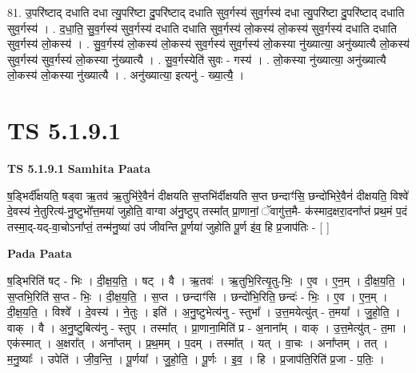 \documentclass[17pt]{extarticle}
\begin{document}
81. उ॒परि॑ष्टाद् दधाति दधा त्यु॒परि॑ष्टा दु॒परि॑ष्टाद् दधाति सुव॒र्गस्य॑ सुव॒र्गस्य॑ दधा त्यु॒परि॑ष्टा दु॒परि॑ष्टाद् दधाति सुव॒र्गस्य॑ । . द॒धा॒ति॒ सु॒व॒र्गस्य॑ सुव॒र्गस्य॑ दधाति दधाति सुव॒र्गस्य॑ लो॒कस्य॑ लो॒कस्य॑ सुव॒र्गस्य॑ दधाति दधाति सुव॒र्गस्य॑ लो॒कस्य॑ । . सु॒व॒र्गस्य॑ लो॒कस्य॑ लो॒कस्य॑ सुव॒र्गस्य॑ सुव॒र्गस्य॑ लो॒कस्या नु॑ख्यात्या॒ अनु॑ख्यात्यै लो॒कस्य॑ सुव॒र्गस्य॑ सुव॒र्गस्य॑ लो॒कस्या नु॑ख्यात्यै । . सु॒व॒र्गस्येति॑ सुवः - गस्य॑ । . लो॒कस्या नु॑ख्यात्या॒ अनु॑ख्यात्यै लो॒कस्य॑ लो॒कस्या नु॑ख्यात्यै । . अनु॑ख्यात्या॒ इत्यनु॑ - ख्या॒त्यै॒ । \newline
\pagebreak
{}

\section{ TS 5.1.9.1 }

\textbf{TS 5.1.9.1 } \newline
\textbf{Samhita Paata} \newline

ष॒ड्भिर्दी᳚क्षयति॒ षड्वा ऋ॒तव॑ ऋ॒तुभि॑रे॒वैनं॑ दीक्षयति स॒प्तभि॑र्दीक्षयति स॒प्त छन्दाꣳ॑सि॒ छन्दो॑भिरे॒वैनं॑ दीक्षयति॒ विश्वे॑ दे॒वस्य॑ ने॒तुरित्य॑-नु॒ष्टुभो᳚त्त॒मया॑ जुहोति॒ वाग्वा अ॑नु॒ष्टुप् तस्मा᳚त् प्रा॒णानां॒ ॅवागु॑त्त॒मै- क॑स्माद॒क्षरा॒दना᳚प्तं प्रथ॒मं प॒दं तस्मा॒द्-यद्-वा॒चोऽना᳚प्तं॒ तन्म॑नु॒ष्या॑ उप॑ जीवन्ति पू॒र्णया॑ जुहोति पू॒र्ण इ॑व॒ हि प्र॒जाप॑तिः - [  ] \newline

\textbf{Pada Paata} \newline

ष॒ड्भिरिति॑ षट् - भिः । दी॒क्ष॒य॒ति॒ । षट् । वै । ऋ॒तवः॑ । ऋ॒तुभि॒रित्यृ॒तु-भिः॒ । ए॒व । ए॒न॒म् । दी॒क्ष॒य॒ति॒ । स॒प्तभि॒रिति॑ स॒प्त - भिः॒ । दी॒क्ष॒य॒ति॒ । स॒प्त । छन्दाꣳ॑सि । छन्दो॑भि॒रिति॒ छन्दः॑ - भिः॒ । ए॒व । ए॒न॒म् । दी॒क्ष॒य॒ति॒ । विश्वे᳚ । दे॒वस्य॑ । ने॒तुः । इति॑ । अ॒नु॒ष्टुभेत्य॑नु - स्तुभा᳚ । उ॒त्त॒मयेत्यु॑त् - त॒मया᳚ । जु॒हो॒ति॒ । वाक् । वै । अ॒नु॒ष्टुबित्य॑नु - स्तुप् । तस्मा᳚त् । प्रा॒णाना॒मिति॑ प्र - अ॒नाना᳚म् । वाक् । उ॒त्त॒मेत्यु॑त् - त॒मा । एक॑स्मात् । अ॒क्षरा᳚त् । अना᳚प्तम् । प्र॒थ॒मम् । प॒दम् । तस्मा᳚त् । यत् । वा॒चः । अना᳚प्तम् । तत् । म॒नु॒ष्याः᳚ । उपेति॑ । जी॒व॒न्ति॒ । पू॒र्णया᳚ । जु॒हो॒ति॒ । पू॒र्णः । इ॒व॒ । हि । प्र॒जाप॑ति॒रिति॑ प्र॒जा - प॒तिः॒ ।  \newline
\end{document}
